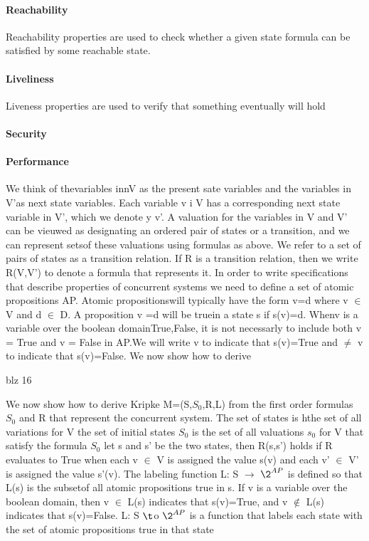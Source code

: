 \paragraph{Reachability}
Reachability properties are used to check whether
a given state formula can be satisfied by some
reachable state.

\paragraph{Liveliness}
Liveness properties are used to verify that
something eventually will hold
\paragraph{Security}

\paragraph{Performance}

We think of thevariables innV as the present sate variables and the variables in V'as next state variables. Each variable v i V has a corresponding next state variable in V', which we denote y v'. A valuation for the variables in V and V' can be vieuwed as designating an ordered pair of states or a transition, and we can represent setsof these valuations using formulas as above. We refer to a set of pairs of states as a transition relation. If R is a transition relation, then we write R(V,V') to denote a formula that represents it.
In order to write specifications that describe properties of concurrent systems we need to define a set of atomic propositions AP. Atomic propositionswill typically have the form v=d where v $\in$ V and d $\in$ D. A proposition v =d will be truein a state s if s(v)=d. Whenv is a variable over the  boolean domain{True,False}, it is not necessarly to include both v = True and  v = False in AP.We will write v to indicate that s(v)=True and $\neq$ v to indicate that s(v)=False.
We now show how to derive

blz 16

We now show how to derive Kripke M=(S,$S_0$,R,L) from the first order formulas $S_0$ and R that represent the concurrent system.
The set of states is hthe set of all variations	for V
the set of initial states $S_0$ is the set of all valuations $s_0$ for V that satisfy the formula $S_0$
let s and s' be the two states, then R(s,s') holds if R evaluates to True when each v $\in$ V is assigned the value s(v) and each v' $\in$  V' is assigned the value s'(v).
The labeling function L: S $\to$  $\2^{AP}$ is defined so that L(s) is the subsetof all atomic propositions true in s. If v is a variable over the boolean domain, then v $\in$ L(s) indicates that s(v)=True, and v $\notin$  L(s) indicates that s(v)=False.
L: S $\t$o  $\2^{AP}$  is a function that labels each state with the set of atomic propositions true in that state\\

